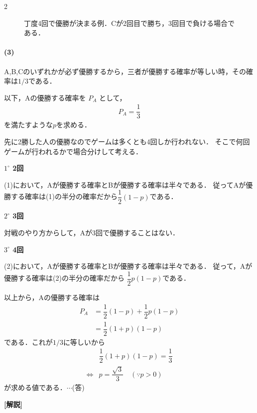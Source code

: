 \documentclass[../../main.tex]{subfiles}
\begin{document}
\begin{multicols}{2}
\begin{figure}[H]
    \caption{丁度4回で優勝が決まる例．Cが2回目で勝ち，3回目で負ける場合である．}
    \label{1994-4:fig:1}
  \end{figure}
  \paragraph{(3)}
  A,B,Cのいずれかが必ず優勝するから，三者が優勝する確率が等しい時，その確率は$1/3$である．

  以下，Aの優勝する確率を $P_A$ として，
  \begin{align}
    P_A = \dfrac{1}{3}
  \end{align}
  を満たすような$p$を求める．

  先に2勝した人の優勝なのでゲームは多くとも4回しか行われない．
  そこで何回ゲームが行われるかで場合分けして考える．

  \textbf{$1^{\circ}$ 2回}

  (1)において，Aが優勝する確率とBが優勝する確率は半々である．
  従ってAが優勝する確率は(1)の半分の確率だから$\dfrac{1}{2}(1-p)$である．

  \textbf{$2^{\circ}$ 3回}

  対戦のやり方からして，Aが3回で優勝することはない．

  \textbf{$3^{\circ}$ 4回}

  (2)において，Aが優勝する確率とBが優勝する確率は半々である．
  従って，Aが優勝する確率は(2)の半分の確率だから $\dfrac{1}{2} p(1-p)$である．

  以上から，Aの優勝する確率は
  \begin{align}
    P_A
    & = \dfrac{1}{2}(1-p) + \dfrac{1}{2} p(1-p) \\
    & = \dfrac{1}{2}(1+p)(1-p)
  \end{align}
  である．これが$1/3$に等しいから
  \begin{align}
    & \dfrac{1}{2}(1+p)(1-p) = \dfrac{1}{3}            \\
    \iff
    & p = \dfrac{\sqrt{3}}{3} \quad (\because p > 0 )
  \end{align}
  が求める値である．$\cdots$(答)

  {\bf [解説]}

  \newpage
\end{multicols}
\end{document}
